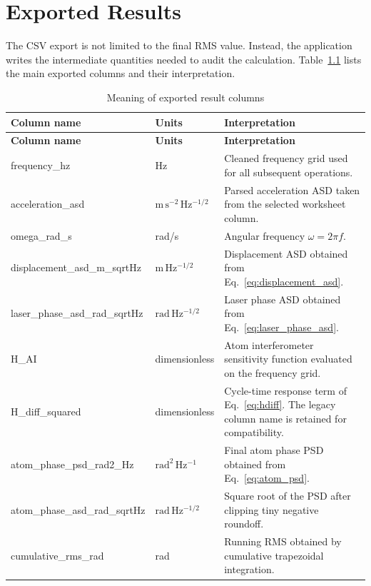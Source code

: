 \documentclass[11pt,a4paper]{report}
\newcommand{\tableheader}[1]{\textbf{\color{white}#1}}
\begin{document}
\chapter{Exported Results}

The CSV export is not limited to the final RMS value. Instead, the application writes the intermediate quantities needed to audit the calculation. Table~\ref{tab:outputs} lists the main exported columns and their interpretation.

\begin{longtable}{@{}p{}p{}p{}@{}}
\caption{Meaning of exported result columns}\label{tab:outputs}\\
\toprule
\rowcolor{primaryblue}
\tableheader{Column name} & \tableheader{Units} & \tableheader{Interpretation} \\
\midrule
\endfirsthead
\toprule
\rowcolor{primaryblue}
\tableheader{Column name} & \tableheader{Units} & \tableheader{Interpretation} \\
\midrule
\endhead
frequency\_hz & Hz & Cleaned frequency grid used for all subsequent operations. \\
\rowcolor{tablealt}
acceleration\_asd & $\mathrm{m\,s^{-2}\,Hz^{-1/2}}$ & Parsed acceleration ASD taken from the selected worksheet column. \\
omega\_rad\_s & rad/s & Angular frequency $\omega = 2\pi f$. \\
\rowcolor{tablealt}
displacement\_asd\_m\_sqrtHz & $\mathrm{m\,Hz^{-1/2}}$ & Displacement ASD obtained from Eq.~\eqref{eq:displacement_asd}. \\
laser\_phase\_asd\_rad\_sqrtHz & $\mathrm{rad\,Hz^{-1/2}}$ & Laser phase ASD obtained from Eq.~\eqref{eq:laser_phase_asd}. \\
\rowcolor{tablealt}
H\_AI & dimensionless & Atom interferometer sensitivity function evaluated on the frequency grid. \\
H\_diff\_squared & dimensionless & Cycle-time response term of Eq.~\eqref{eq:hdiff}. The legacy column name is retained for compatibility. \\
\rowcolor{tablealt}
atom\_phase\_psd\_rad2\_Hz & $\mathrm{rad^2\,Hz^{-1}}$ & Final atom phase PSD obtained from Eq.~\eqref{eq:atom_psd}. \\
atom\_phase\_asd\_rad\_sqrtHz & $\mathrm{rad\,Hz^{-1/2}}$ & Square root of the PSD after clipping tiny negative roundoff. \\
\rowcolor{tablealt}
cumulative\_rms\_rad & rad & Running RMS obtained by cumulative trapezoidal integration. \\
\bottomrule
\end{longtable}
\end{document}
